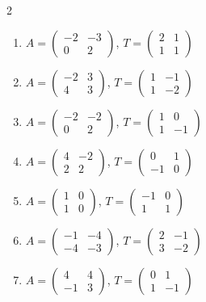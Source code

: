 \begin{multicols}{2}
\begin{enumerate}[label=\arabic*., leftmargin=*]
\item $A=\begin{pmatrix}-2 & -3\\ 0 & 2\end{pmatrix}$, $T=\begin{pmatrix}2 & 1\\ 1 & 1\end{pmatrix}$
\item $A=\begin{pmatrix}-2 & 3\\ 4 & 3\end{pmatrix}$, $T=\begin{pmatrix}1 & -1\\ 1 & -2\end{pmatrix}$
\item $A=\begin{pmatrix}-2 & -2\\ 0 & 2\end{pmatrix}$, $T=\begin{pmatrix}1 & 0\\ 1 & -1\end{pmatrix}$
\item $A=\begin{pmatrix}4 & -2\\ 2 & 2\end{pmatrix}$, $T=\begin{pmatrix}0 & 1\\ -1 & 0\end{pmatrix}$
\item $A=\begin{pmatrix}1 & 0\\ 1 & 0\end{pmatrix}$, $T=\begin{pmatrix}-1 & 0\\ 1 & 1\end{pmatrix}$
\item $A=\begin{pmatrix}-1 & -4\\ -4 & -3\end{pmatrix}$, $T=\begin{pmatrix}2 & -1\\ 3 & -2\end{pmatrix}$
\item $A=\begin{pmatrix}4 & 4\\ -1 & 3\end{pmatrix}$, $T=\begin{pmatrix}0 & 1\\ 1 & -1\end{pmatrix}$

\end{enumerate}
\end{multicols}
